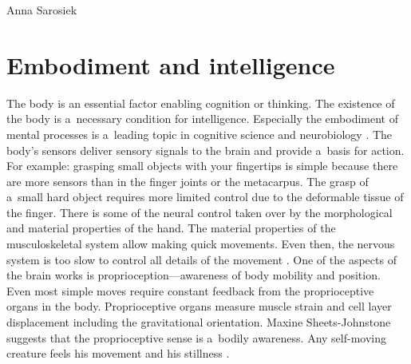 \begin{artengenv}{Anna Sarosiek}
\section*{Embodiment and intelligence}
The body is an essential factor enabling cognition or thinking. The existence of the body is a~necessary condition for intelligence. Especially the embodiment of mental processes is a~leading topic in cognitive science and neurobiology
\parencites[][]{clark_being_1997}[][]{damasio_descartes_1994}[][]{deely_basics_1990}[][]{lakoff_philosophy_1999}[][]{varela_embodied_1993}. %
 The body’s sensors deliver sensory signals to the brain and provide a~basis for action. For example: grasping small objects with your fingertips is simple because there are more sensors than in the finger joints or the metacarpus. The grasp of a~small hard object requires more limited control due to the deformable tissue of the finger. There is some of the neural control taken over by the morphological and material properties of the hand. The material properties of the musculoskeletal system allow making quick movements. Even then, the nervous system is too slow to control all details of the movement 
\parencites[][]{clark_being_1997}[][]{damasio_descartes_1994}[][]{deely_basics_1990}[][]{lakoff_philosophy_1999}[][]{varela_embodied_1993}. %
 One of the aspects of the brain works is proprioception---awareness of body mobility and position. Even most simple moves require constant feedback from the proprioceptive organs in the body. Proprioceptive organs measure muscle strain and cell layer displacement including the gravitational orientation. Maxine Sheets-Johnstone suggests that the proprioceptive sense is a~bodily awareness. Any self-moving creature feels his movement and his stillness 
\parencite[][]{sheets-johnstone_consciousness_1998}.%



\end{artengenv}

